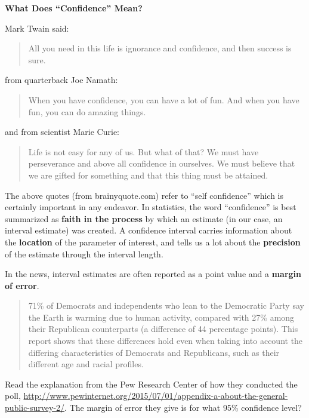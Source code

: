 \def\theTopic{Reading 6}



\begin{center}
\vspace*{-.2in}
{\bf {\large What Does ``Confidence'' Mean?}}\\
\end{center}

Mark Twain said:
\begin{quotation}
All you need in this life is ignorance and confidence, and then
success is sure.   
\end{quotation}

 from quarterback Joe Namath:
\begin{quotation}
When you have confidence, you can have a lot of fun. And when you have fun, you can do amazing things.  
\end{quotation}

and from scientist Marie Curie:
\begin{quotation}
  Life is not easy for any of us. But what of that? We must have
  perseverance and above all confidence in ourselves. We must believe
  that we are gifted for something and that this thing must be
  attained. 
\end{quotation}

The above quotes (from brainyquote.com) refer to  ``self confidence''
which is certainly important in any endeavor.
In statistics, the word ``confidence'' is best summarized as {\bf
  faith in the process} by which an estimate (in our case, an interval
estimate) was created.  A confidence interval carries information
about the {\bf location} of the parameter of interest, and tells us a lot
about the {\bf precision} of the estimate through the interval
length. 


In the news, interval estimates are often reported as a point value
and a {\bf margin of error}. 

\begin{quotation}
  71\% of Democrats and independents who lean to the Democratic Party
  say the Earth is warming due to human activity, compared with 27\%
  among their Republican counterparts (a difference of 44 percentage
  points). This report shows that these differences hold even when
  taking into account the differing characteristics of Democrats and
  Republicans, such as their different age and racial profiles. 
\end{quotation}

  Read the explanation from the  Pew Research Center  of how they
  conducted the poll,
\url{http://www.pewinternet.org/2015/07/01/appendix-a-about-the-general-public-survey-2/}.
 The margin of error they give is for what 95\% confidence level?
  \vfill

